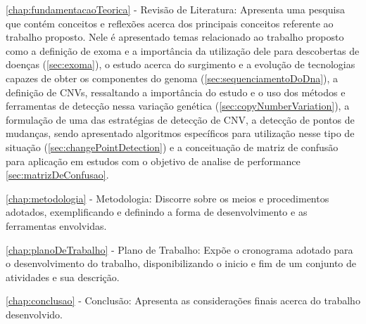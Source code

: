 \autoref{chap:fundamentacaoTeorica} - Revisão de Literatura: Apresenta uma pesquisa que contém conceitos e reflexões acerca dos principais conceitos referente ao trabalho proposto. Nele é apresentado temas relacionado ao trabalho proposto como a definição de exoma e a importância da utilização dele para descobertas de doenças (\autoref{sec:exoma}), o estudo acerca do surgimento e a evolução de tecnologias capazes de obter os componentes do genoma (\autoref{sec:sequenciamentoDoDna}), a definição de CNVs, ressaltando a importância do estudo e o uso dos métodos e ferramentas de detecção nessa variação genética (\autoref{sec:copyNumberVariation}), a formulação de uma das estratégias de detecção de CNV, a detecção de pontos de mudanças, sendo apresentado algoritmos específicos para utilização nesse tipo de situação (\autoref{sec:changePointDetection}) e a conceituação de matriz de confusão para aplicação em estudos com o objetivo de analise de performance \autoref{sec:matrizDeConfusao}.

\autoref{chap:metodologia} - Metodologia: Discorre sobre os meios e procedimentos adotados, exemplificando e definindo a forma de desenvolvimento e as ferramentas envolvidas.

\autoref{chap:planoDeTrabalho} - Plano de Trabalho: Expõe o cronograma adotado para o desenvolvimento do trabalho, disponibilizando o inicio e fim de um conjunto de atividades e sua descrição.

\autoref{chap:conclusao} - Conclusão: Apresenta as considerações finais acerca do trabalho desenvolvido.